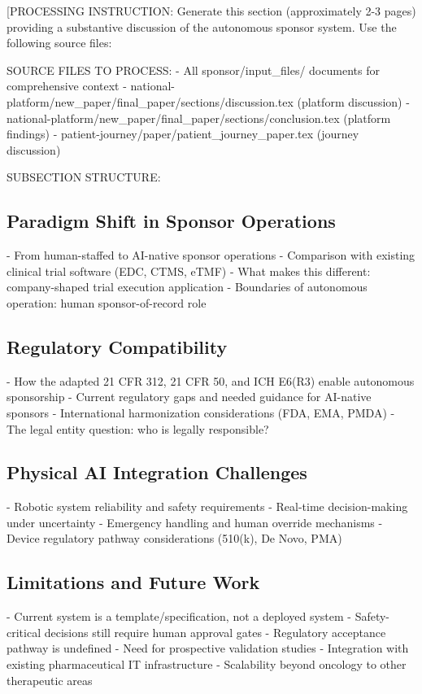 
[PROCESSING INSTRUCTION: Generate this section (approximately 2-3 pages) providing a
substantive discussion of the autonomous sponsor system. Use the following source files:

SOURCE FILES TO PROCESS:
- All sponsor/input\_files/ documents for comprehensive context
- national-platform/new\_paper/final\_paper/sections/discussion.tex (platform discussion)
- national-platform/new\_paper/final\_paper/sections/conclusion.tex (platform findings)
- patient-journey/paper/patient\_journey\_paper.tex (journey discussion)

SUBSECTION STRUCTURE:

\subsection{Paradigm Shift in Sponsor Operations}
- From human-staffed to AI-native sponsor operations
- Comparison with existing clinical trial software (EDC, CTMS, eTMF)
- What makes this different: company-shaped trial execution application
- Boundaries of autonomous operation: human sponsor-of-record role

\subsection{Regulatory Compatibility}
- How the adapted 21 CFR 312, 21 CFR 50, and ICH E6(R3) enable autonomous sponsorship
- Current regulatory gaps and needed guidance for AI-native sponsors
- International harmonization considerations (FDA, EMA, PMDA)
- The legal entity question: who is legally responsible?

\subsection{Physical AI Integration Challenges}
- Robotic system reliability and safety requirements
- Real-time decision-making under uncertainty
- Emergency handling and human override mechanisms
- Device regulatory pathway considerations (510(k), De Novo, PMA)

\subsection{Limitations and Future Work}
- Current system is a template/specification, not a deployed system
- Safety-critical decisions still require human approval gates
- Regulatory acceptance pathway is undefined
- Need for prospective validation studies
- Integration with existing pharmaceutical IT infrastructure
- Scalability beyond oncology to other therapeutic areas

